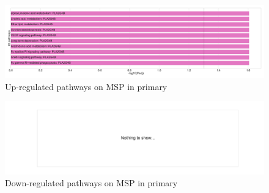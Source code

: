 \documentclass{beamer}
\begin{document}
\begin{frame}[allowframebreaks]
                    \begin{figure}
                        \includegraphics[width=0.6 \linewidth]{figures/DEG/Enrichment/STAR.TPM.SQC.Primary.MSP-Median.Up.KEGG.pdf}
                        \caption{Up-regulated pathways on MSP in primary}
                    \end{figure}

                    \begin{figure}
                        \includegraphics[width=0.6 \linewidth]{figures/DEG/Enrichment/STAR.TPM.SQC.Primary.MSP-Median.Down.KEGG.pdf}
                        \caption{Down-regulated pathways on MSP in primary}
                    \end{figure}
                \end{frame}
\end{document}
